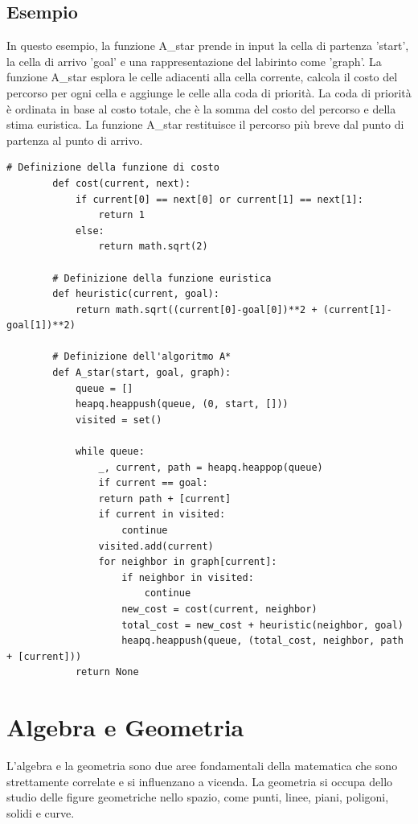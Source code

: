 \subsection{Esempio}\label{subsec:es_subsec}
In questo esempio, la funzione A\_star prende in input la cella di partenza 'start', la cella di arrivo 'goal' e una rappresentazione del labirinto come 'graph'. La funzione A\_star esplora le celle adiacenti alla cella corrente, calcola il costo del percorso per ogni cella e aggiunge le celle alla coda di priorità. La coda di priorità è ordinata in base al costo totale, che è la somma del costo del percorso e della stima euristica. La funzione A\_star restituisce il percorso più breve dal punto di partenza al punto di arrivo.

\begin{minipage}{\textwidth}
	\begin{lstlisting}[caption={Algoritmo A*}]
		# Definizione della funzione di costo
		def cost(current, next):
			if current[0] == next[0] or current[1] == next[1]:
				return 1
			else:
				return math.sqrt(2)
		
		# Definizione della funzione euristica
		def heuristic(current, goal):
			return math.sqrt((current[0]-goal[0])**2 + (current[1]-goal[1])**2)
		
		# Definizione dell'algoritmo A*
		def A_star(start, goal, graph):
			queue = []
			heapq.heappush(queue, (0, start, []))
			visited = set()
			
			while queue:
				_, current, path = heapq.heappop(queue)
				if current == goal:
				return path + [current]
				if current in visited:
					continue
				visited.add(current)
				for neighbor in graph[current]:
					if neighbor in visited:
						continue
					new_cost = cost(current, neighbor)
					total_cost = new_cost + heuristic(neighbor, goal)
					heapq.heappush(queue, (total_cost, neighbor, path + [current]))
			return None
	\end{lstlisting}
\end{minipage}

\section{Algebra e Geometria}\label{sec:algebra}
L'algebra e la geometria sono due aree fondamentali della matematica che sono strettamente correlate e si influenzano a vicenda. La geometria si occupa dello studio delle figure geometriche nello spazio, come punti, linee, piani, poligoni, solidi e curve. 


